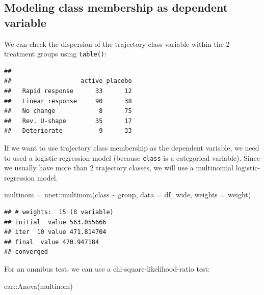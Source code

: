 \documentclass[
]{book}
\newenvironment{Shaded}{\begin{snugshade}}{\end{snugshade}}
\newcommand{\AttributeTok}[1]{\textcolor[rgb]{0.77,0.63,0.00}{#1}}
\newcommand{\FunctionTok}[1]{\textcolor[rgb]{0.00,0.00,0.00}{#1}}
\newcommand{\NormalTok}[1]{#1}
\newcommand{\OtherTok}[1]{\textcolor[rgb]{0.56,0.35,0.01}{#1}}
\newcommand{\SpecialCharTok}[1]{\textcolor[rgb]{0.00,0.00,0.00}{#1}}
\begin{document}
\hypertarget{modeling-class-membership-as-dependent-variable}{%
\subsection{Modeling class membership as dependent variable}\label{modeling-class-membership-as-dependent-variable}}

We can check the dispersion of the trajectory class variable within the 2 treatment groups using \texttt{table()}:

\begin{Shaded}
\end{Shaded}

\begin{verbatim}
##                  
##                   active placebo
##   Rapid response      33      12
##   Linear response     90      38
##   No change            8      75
##   Rev. U-shape        35      17
##   Deteriorate          9      33
\end{verbatim}

If we want to use trajectory class membership as the dependent variable, we need to used a logistic-regression model (because \texttt{class} is a categorical variable). Since we usually have more than 2 trajectory classes, we will use a multinomial logistic-regression model.

\begin{Shaded}
\begin{Highlighting}[]
\NormalTok{multinom }\OtherTok{=}\NormalTok{ nnet}\SpecialCharTok{::}\FunctionTok{multinom}\NormalTok{(class }\SpecialCharTok{\textasciitilde{}}\NormalTok{ group, }\AttributeTok{data =}\NormalTok{ df\_wide, }\AttributeTok{weights =}\NormalTok{ weight)}
\end{Highlighting}
\end{Shaded}

\begin{verbatim}
## # weights:  15 (8 variable)
## initial  value 563.055666 
## iter  10 value 471.814704
## final  value 470.947184 
## converged
\end{verbatim}

For an omnibus test, we can use a chi-square-likelihood-ratio test:

\begin{Shaded}
\begin{Highlighting}[]
\NormalTok{car}\SpecialCharTok{::}\FunctionTok{Anova}\NormalTok{(multinom)}
\end{Highlighting}
\end{Shaded}
\end{document}
